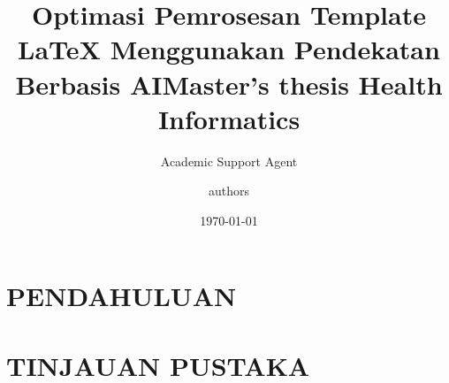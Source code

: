 \documentclass{report}
\title{Optimasi Pemrosesan Template LaTeX Menggunakan Pendekatan Berbasis AI}
\author{Academic Support Agent}
\date{\today}
\begin{document}
\maketitle

\begin{abstract}

\end{abstract}

\chapter{PENDAHULUAN}


\chapter{TINJAUAN PUSTAKA}


\usepackage[a4paper, tmargin=2.54cm, bmargin=2.54cm, lmargin=3.17cm, rmargin=3.17cm]{geometry}
\newcommand{\head}[1]{\textnormal{\textbf{#1}}}

\usepackage{titlesec}    %
\titleformat{\chapter}{\normalfont\huge\bf}{\thechapter}{20pt}{\huge\bf}

\title{Master's thesis Health Informatics \the\year}
\author{authors}
\setcounter{tocdepth}{3}
\renewcommand{\figurename}{Figure}
\renewcommand{\listfigurename}{List of Figures}
\usepackage{graphicx}
\usepackage{booktabs}
\usepackage{natbib}
\usepackage{xcolor}

\usepackage{hyperref}	%
\hypersetup{	%
    colorlinks=true,
    citecolor = blue,	%
    linkcolor=black,    %
    filecolor=magenta,      
    urlcolor=cyan,
}

\end{document}
